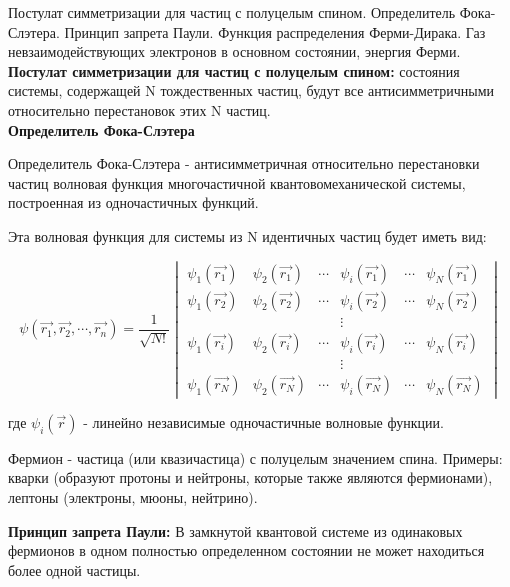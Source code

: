 \documentclass[__main__.tex]{subfiles}
\begin{document}
Постулат симметризации для частиц с полуцелым спином. Определитель Фока-Слэтера. Принцип запрета Паули. Функция распределения Ферми-Дирака. Газ невзаимодействующих электронов в основном состоянии, энергия Ферми.\\ 

\textbf{Постулат симметризации для частиц с полуцелым спином: } состояния системы, содержащей N тождественных частиц, будут все антисимметричными относительно перестановок этих N частиц.\\

\textbf{Определитель Фока-Слэтера}
\begin{definition}
Определитель Фока-Слэтера - антисимметричная относительно перестановки частиц волновая функция многочастичной квантовомеханической системы, построенная из одночастичных функций.
\end{definition}

Эта волновая функция для системы из N идентичных частиц будет иметь вид:

$$\psi(\vec{r_1}, \vec{r_2}, \cdots, \vec{r_n}) = \frac{1}{\sqrt{N!}}\begin{vmatrix} 
\psi_1(\vec{r_1}) & \psi_2(\vec{r_1}) & \cdots & \psi_i(\vec{r_1}) & \cdots & \psi_N(\vec{r_1}) \\ 
\psi_1(\vec{r_2}) & \psi_2(\vec{r_2}) & \cdots & \psi_i(\vec{r_2}) & \cdots & \psi_N(\vec{r_2}) \\ 
 &  &  & \vdots &  & \\ 
\psi_1(\vec{r_i}) & \psi_2(\vec{r_i}) & \cdots & \psi_i(\vec{r_i}) & \cdots & \psi_N(\vec{r_i}) \\
&  &  & \vdots &  & \\
\psi_1(\vec{r_N}) & \psi_2(\vec{r_N}) & \cdots & \psi_i(\vec{r_N}) & \cdots & \psi_N(\vec{r_N}) \end{vmatrix}$$

где $\psi_i(\vec{r})$ - линейно независимые одночастичные волновые функции.

\begin{definition}
Фермион - частица (или квазичастица) с полуцелым значением спина. Примеры: кварки (образуют протоны и нейтроны, которые также являются фермионами), лептоны (электроны, мюоны, нейтрино).
\end{definition}

\textbf{Принцип запрета Паули:} В замкнутой квантовой системе из одинаковых фермионов в одном полностью определенном состоянии не может находиться более одной частицы.\\
\end{document}
